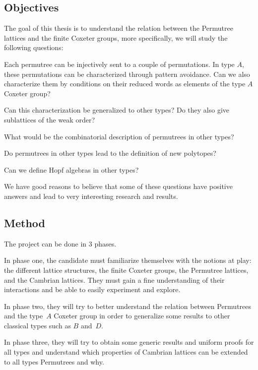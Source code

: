 \documentclass[a4paper,12pt]{article}
\begin{document}
\subsection{Objectives}

The goal of this thesis is to understand the relation between the Permutree lattices and the finite Coxeter groups, more specifically, we will study the following questions:

\begin{compactitem}
\item Each permutree can be injectively sent to a couple of permutations. In type $A$, these permutations can be characterized through pattern avoidance. Can we also characterize them by conditions on their reduced words as elements of the type $A$ Coxeter group? 
\item Can this characterization be generalized to other types? Do they also give sublattices of the weak order?
\item What would be the combinatorial description of permutrees in other types?
\item Do permutrees in other types lead to the definition of new polytopes?
\item Can we define Hopf algebras in other types?
\end{compactitem}

We have good reasons to believe that some of these questions have positive answers and lead to very interesting research and results. 

\subsection{Method}

The project can be done in 3 phases.

In phase one, the candidate must familiarize themselves with the notions at play: the different lattice structures, the finite Coxeter groups, the Permutree lattices, and the Cambrian lattices. They must gain a fine understanding of their interactions and be able to easily experiment and explore.

In phase two, they will try to better understand the relation between Permutrees and the type~$A$ Coxeter group in order to generalize some results to other classical types such as $B$ and~$D$. 

In phase three, they will try to obtain some generic results and uniform proofs for all types and understand which properties of Cambrian lattices can be extended to all types Permutrees and why. 
\end{document}
